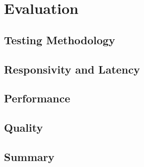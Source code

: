 \chapter{Evaluation} %

\label{Chapter6} %


\section{Testing Methodology}

\todosection


\section{Responsivity and Latency}

\todosection


\section{Performance}

\todosection


\section{Quality}

\todosection


\section{Summary}

\todosection